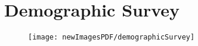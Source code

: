 \section{Demographic Survey}

\begin{figure}[b]
	\begin{center}
		\texttt{[image: newImagesPDF/demographicSurvey]}
	\end{center}
\end{figure}